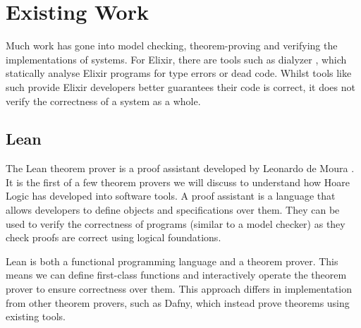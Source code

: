 \section[]{Existing Work}
Much work has gone into model checking, theorem-proving and verifying the implementations of systems. For Elixir, there are tools such as dialyzer \cite{dialyzer}, which statically analyse Elixir programs for type errors or dead code. Whilst tools like such provide Elixir developers better guarantees their code is correct, it does not verify the correctness of a system as a whole. 
\subsection[]{Lean}
The Lean theorem prover is a proof assistant developed by Leonardo de Moura \cite{lean}. It is the first of a few theorem provers we will discuss to understand how Hoare Logic has developed into software tools. A proof assistant is a language that allows developers to define objects and specifications over them. They can be used to verify the correctness of programs (similar to a model checker) as they check proofs are correct using logical foundations.
\par
Lean is both a functional programming language and a theorem prover. This means we can define first-class functions and interactively operate the theorem prover to ensure correctness over them. This approach differs in implementation from other theorem provers, such as Dafny, which instead prove theorems using existing tools.

